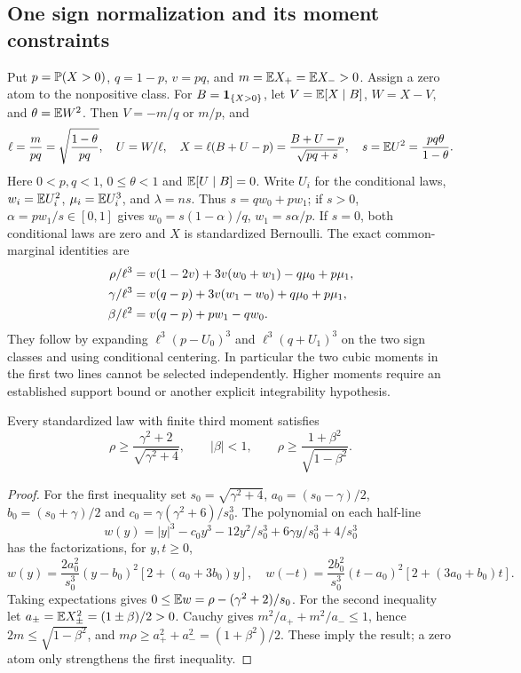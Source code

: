 \subsection{One sign normalization and its moment constraints}
Put $p=\mathbb P(X>0)$, $q=1-p$, $v=pq$, and
$m=\mathbb E X_+=\mathbb E X_->0$. Assign a zero atom to the nonpositive class.
For $B=\mathbf1_{\{X>0\}}$, let $V=\mathbb E[X\mid B]$, $W=X-V$, and
$\theta=\mathbb E W^2$. Then $V=-m/q$ or $m/p$, and
\begin{equation}\label{j:core:normalization}
 \ell=\frac m{pq}=\sqrt{\frac{1-\theta}{pq}},\quad
 U=W/\ell,\quad X=\ell(B+U-p)=\frac{B+U-p}{\sqrt{pq+s}},\quad
 s=\mathbb E U^2=\frac{pq\theta}{1-\theta}.
\end{equation}
Here $0<p,q<1$, $0\le\theta<1$ and $\mathbb E[U\mid B]=0$.
Write $U_i$ for the conditional laws, $w_i=\mathbb E U_i^2$,
$\mu_i=\mathbb E U_i^3$, and $\lambda=ns$. Thus $s=qw_0+pw_1$; if $s>0$,
$\alpha=pw_1/s\in[0,1]$ gives $w_0=s(1-\alpha)/q$, $w_1=s\alpha/p$.
If $s=0$, both conditional laws are zero and $X$ is standardized Bernoulli.
The exact common-marginal identities are
\begin{align}
 \rho/\ell^3&=v(1-2v)+3v(w_0+w_1)-q\mu_0+p\mu_1,\notag\\
 \gamma/\ell^3&=v(q-p)+3v(w_1-w_0)+q\mu_0+p\mu_1,\label{j:core:conditional-moments}\\
 \beta/\ell^2&=v(q-p)+pw_1-qw_0.\notag
\end{align}
They follow by expanding $\ell^3(p-U_0)^3$ and
$\ell^3(q+U_1)^3$ on the two sign classes and using conditional centering.
In particular the two cubic moments in the first two lines cannot be
selected independently. Higher moments require an established support
bound or another explicit integrability hypothesis.

\begin{lemma}\label{j:core:moments}
Every standardized law with finite third moment satisfies
\[
 \rho\ge\frac{\gamma^2+2}{\sqrt{\gamma^2+4}},\qquad
 |\beta|<1,\qquad \rho\ge\frac{1+\beta^2}{\sqrt{1-\beta^2}}.
\]
\end{lemma}
\begin{proof}
For the first inequality set $s_0=\sqrt{\gamma^2+4}$,
$a_0=(s_0-\gamma)/2$, $b_0=(s_0+\gamma)/2$ and
$c_0=\gamma(\gamma^2+6)/s_0^3$. The polynomial on each half-line
\[
 w(y)=|y|^3-c_0y^3-12y^2/s_0^3+6\gamma y/s_0^3+4/s_0^3
\]
has the factorizations, for $y,t\ge0$,
\[
 w(y)=\frac{2a_0^2}{s_0^3}(y-b_0)^2[2+(a_0+3b_0)y],\quad
 w(-t)=\frac{2b_0^2}{s_0^3}(t-a_0)^2[2+(3a_0+b_0)t].
\]
Taking expectations gives $0\le\mathbb E w=\rho-(\gamma^2+2)/s_0$.
For the second inequality let $a_\pm=\mathbb E X_\pm^2=(1\pm\beta)/2>0$.
Cauchy gives $m^2/a_++m^2/a_-\le1$, hence
$2m\le\sqrt{1-\beta^2}$, and
$m\rho\ge a_+^2+a_-^2=(1+\beta^2)/2$. These imply the result;
a zero atom only strengthens the first inequality.
\end{proof}

